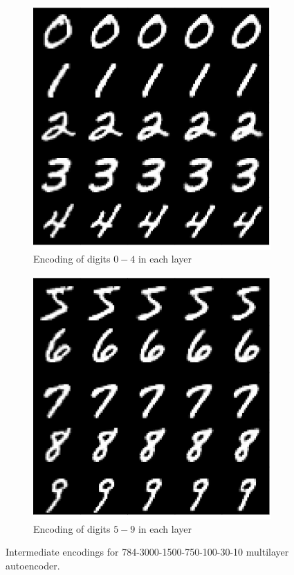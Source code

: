 \documentclass{article}
\begin{document}
\begin{figure}[htbp!]
    \centering
    \begin{subfigure}{.45\textwidth}
        \centering
        \includegraphics[width=\textwidth]{incremental_0-4.png}
        \caption{Encoding of digits $0-4$ in each layer}
        \label{fig:incremental_0-4}
    \end{subfigure}%
    \quad
    \begin{subfigure}{.45\textwidth}
        \centering
        \includegraphics[width=\textwidth]{incremental_5-9.png}
        \caption{Encoding of digits $5-9$ in each layer}
        \label{fig:incremental_5-9}
    \end{subfigure}
    \caption{Intermediate encodings for 784-3000-1500-750-100-30-10 multilayer autoencoder.}
\end{figure}
\end{document}
